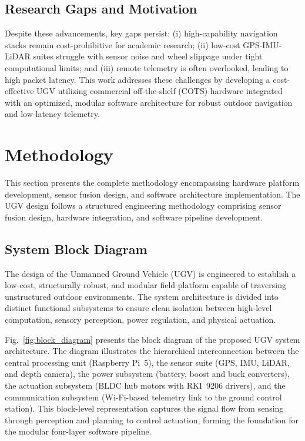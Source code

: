 \documentclass[conference]{IEEEtran}
\begin{document}
\subsection{Research Gaps and Motivation}

Despite these advancements, key gaps persist: (i) high-capability navigation stacks remain cost-prohibitive for academic research; (ii) low-cost GPS-IMU-LiDAR suites struggle with sensor noise and wheel slippage under tight computational limits; and (iii) remote telemetry is often overlooked, leading to high packet latency. This work addresses these challenges by developing a cost-effective UGV utilizing commercial off-the-shelf (COTS) hardware integrated with an optimized, modular software architecture for robust outdoor navigation and low-latency telemetry.

\section{Methodology}
\label{sec:methodology}

This section presents the complete methodology encompassing hardware platform development, sensor fusion design, and software architecture implementation. The UGV design follows a structured engineering methodology comprising sensor fusion design, hardware integration, and software pipeline development.

\subsection{System Block Diagram}

The design of the Unmanned Ground Vehicle (UGV) is engineered to establish a low-cost, structurally robust, and modular field platform capable of traversing unstructured outdoor environments. The system architecture is divided into distinct functional subsystems to ensure clean isolation between high-level computation, sensory perception, power regulation, and physical actuation. 

Fig.~\ref{fig:block_diagram} presents the block diagram of the proposed UGV system architecture. The diagram illustrates the hierarchical interconnection between the central processing unit (Raspberry Pi~5), the sensor suite (GPS, IMU, LiDAR, and depth camera), the power subsystem (battery, boost and buck converters), the actuation subsystem (BLDC hub motors with RKI~9206 drivers), and the communication subsystem (Wi-Fi-based telemetry link to the ground control station). This block-level representation captures the signal flow from sensing through perception and planning to control actuation, forming the foundation for the modular four-layer software pipeline.
\end{document}
